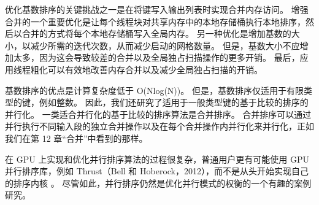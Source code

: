 优化基数排序的关键挑战之一是在将键写入输出列表时实现合并内存访问。 增强合并的一个重要优化是让每个线程块对共享内存中的本地存储桶执行本地排序，然后以合并的方式将每个本地存储桶写入全局内存。 另一种优化是增加基数的大小，以减少所需的迭代次数，从而减少启动的网格数量。 但是，基数大小不应增加太多，因为这会导致较差的合并以及全局独占扫描操作的更多开销。 最后，应用线程粗化可以有效地改善内存合并以及减少全局独占扫描的开销。

基数排序的优点是计算复杂度低于 O(Nlog(N))。 但是，基数排序仅适用于有限类型的键，例如整数。 因此，我们还研究了适用于一般类型键的基于比较的排序的并行化。 一类适合并行化的基于比较的排序算法是合并排序。 合并排序可以通过并行执行不同输入段的独立合并操作以及在每个合并操作内并行化来并行化，正如我们在第 12 章“合并”中看到的那样。

在 GPU 上实现和优化并行排序算法的过程很复杂，普通用户更有可能使用 GPU 并行排序库，例如 Thrust（Bell 和 Hoberock，2012），而不是从头开始实现自己的排序内核 。 尽管如此，并行排序仍然是优化并行模式的权衡的一个有趣的案例研究。